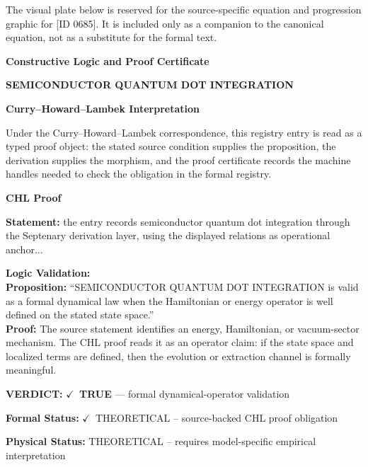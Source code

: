 \begingroup\footnotesize\sloppy
The visual plate below is reserved for the source-specific equation and progression graphic for [ID 0685]. It is included only as a companion to the canonical equation, not as a substitute for the formal text.
\par\endgroup
\ifTZPDarkEdition
{}
\fi

\clearpage
\begingroup\tzpsupportsetup
\noindent\textbf{\fontsize{10.8pt}{12.8pt}\selectfont [ID 0685] Constructive Logic and Proof Certificate}\par
\noindent\textbf{\fontsize{10pt}{12pt}\selectfont SEMICONDUCTOR QUANTUM DOT INTEGRATION}\par
\vspace{0.45em}
\begingroup
\footnotesize
\setlength{\parskip}{0.22em}
\setlength{\parindent}{0pt}
\noindent\textbf{Curry--Howard--Lambek Interpretation}\par
Under the Curry--Howard--Lambek correspondence, this registry entry is read as a typed proof
object: the stated source condition supplies the proposition, the derivation supplies the
morphism, and the proof certificate records the machine handles needed to check the obligation
in the formal registry.

\vspace{0.45em}
\noindent\textbf{CHL Proof}\par
\textbf{Statement:} the entry records semiconductor quantum dot integration through the Septenary derivation
layer, using the displayed relations as operational anchor...

\textbf{Logic Validation:}\\
\textbf{Proposition:} ``SEMICONDUCTOR QUANTUM DOT INTEGRATION is valid as a formal dynamical law when the
Hamiltonian or energy operator is well defined on the stated state space.''\\
\textbf{Proof:} The source statement identifies an energy, Hamiltonian, or vacuum-sector mechanism. The
CHL proof reads it as an operator claim: if the state space and localized terms are
defined, then the evolution or extraction channel is formally meaningful.

\textbf{VERDICT:} \ensuremath{\checkmark}\ \textbf{TRUE} --- formal dynamical-operator validation

\textbf{Formal Status:} \ensuremath{\checkmark}\ THEORETICAL -- source-backed CHL proof obligation

\textbf{Physical Status:} THEORETICAL -- requires model-specific empirical interpretation
\par\vspace{0.45em}
\par
\ifTZPDarkEdition
{}
\fi
\endgroup
\endgroup
